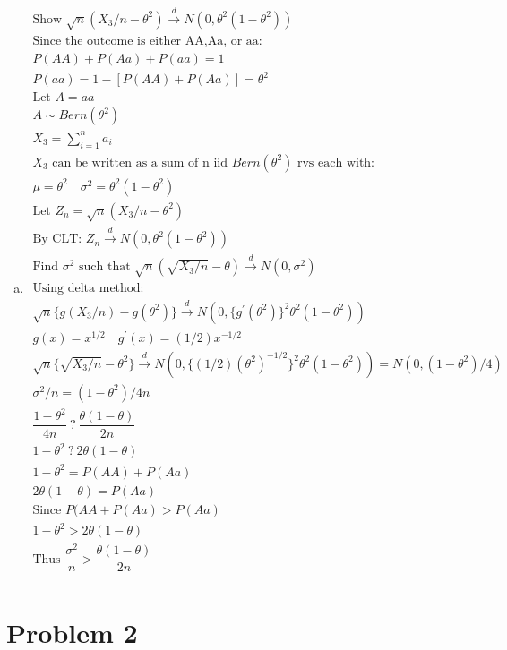 \documentclass{article}
\newcommand{\cd}{\overset{d}{\to}}
\newcommand{\sg}{\sigma}
\newcommand{\sumn}{\sum_{i=1}^{n}}
\newcommand{\ta}{\theta}
\newcommand{\qe}{ \ ?\ }
\begin{document}
\begin{flushleft}
\begin{enumerate}[(a)]
\pagebreak
	\item 
\begin{multline*}\\
\text{Show } \sqrt{n}(X_3/n-\ta^2)\cd N(0,\ta^2(1-\ta^2))\\
\text{Since the outcome is either AA,Aa, or aa:}\\
P(AA)+P(Aa)+P(aa)=1\\
P(aa)=1-[P(AA)+P(Aa)]=\theta^2\\
\text{Let } A=aa\\
A\sim Bern(\theta^2)\\
X_3=\sumn a_i\\
X_3 \text{ can be written as a sum of n iid } Bern(\theta^2) \text{ rvs each with:}\\
\mu=\theta^2 \quad \sigma^2=\ta^2(1-\ta^2)\\
\text{Let } Z_n=\sqrt{n}(X_3/n-\ta^2)\\
\text{By CLT: }Z_n\cd N(0,\ta^2(1-\ta^2))\\
\text{Find } \sigma^2 \text{ such that } \sqrt{n}(\sqrt{X_3/n}-\ta)\cd N(0,\sg^2)\\
\text{Using delta method:}\\
\sqrt{n}\{g(X_3/n)-g(\ta^2)\}\cd N(0,\{g^{'}(\ta^2)\}^2\ta^2(1-\ta^2))\\
g(x)=x^{1/2} \quad g^{'}(x)=(1/2)x^{-1/2}\\
\sqrt{n}\{\sqrt{X_3/n}-\ta^2\}\cd N(0,\{(1/2)(\ta^{2})^{-1/2}\}^2\ta^2(1-\ta^2))=N(0,(1-\ta^2)/4)\\
\sigma^2/n=(1-\ta^2)/4n\\
\dfrac{1-\ta^2}{4n} \qe \dfrac{\ta(1-\ta)}{2n}\\
1-\ta^2 \qe 2\ta(1-\ta)\\
1-\theta^2=P(AA)+P(Aa)\\
2\ta(1-\ta)=P(Aa)\\
\text{Since } P(AA+P(Aa)>P(Aa)\\
1-\ta^2 > 2\ta(1-\ta)\\
\text{Thus } \dfrac{\sigma^2}{n}>\dfrac{\ta(1-\ta)}{2n}\\
\end{multline*}

\end{enumerate}
\pagebreak
	\section*{Problem 2}
\begin{enumerate}[(a)]
	

\end{enumerate}
\end{flushleft}
\end{document}
